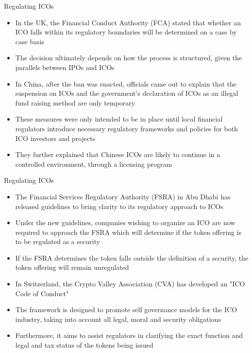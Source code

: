 \documentclass[9pt]{beamer}
\begin{document}
\begin{frame}{Regulating ICOs}
	\begin{itemize}
		\item In the UK, the Financial Conduct Authority (FCA) stated that whether an ICO falls within its regulatory boundaries will be determined on a case by case basis
		\item The decision ultimately depends on how the process is structured, given the parallels between IPOs and ICOs
		\item In China, after the ban was enacted, officials came out to explain that the suspension on ICOs and the government's declaration of ICOs as an illegal fund raising method are only temporary
		\item These measures were only intended to be in place until local financial regulators introduce necessary regulatory frameworks and policies for both ICO investors and projects
		\item They further explained that Chinese ICOs are likely to continue in a controlled environment, through a licensing program
	\end{itemize}
\end{frame}


\begin{frame}{Regulating ICOs}
	\begin{itemize}
		\item The Financial Services Regulatory Authority (FSRA) in Abu Dhabi has released guidelines to bring clarity to its regulatory approach to ICOs
		\item Under the new guidelines, companies wishing to organize an ICO are now required to approach the FSRA which will determine if the token offering is to be regulated as a security
		\item If the FSRA determines the token falls outside the definition of a security, the token offering will remain unregulated
		\item In Switzerland, the Crypto Valley Association (CVA) has developed an "ICO Code of Conduct"
		\item The framework is designed to promote self governance models for the ICO industry, taking into account all legal, moral and security obligations
		\item Furthermore, it aims to assist regulators in clarifying the exact function and legal and tax status of the tokens being issued
	\end{itemize}
\end{frame}
\end{document}
